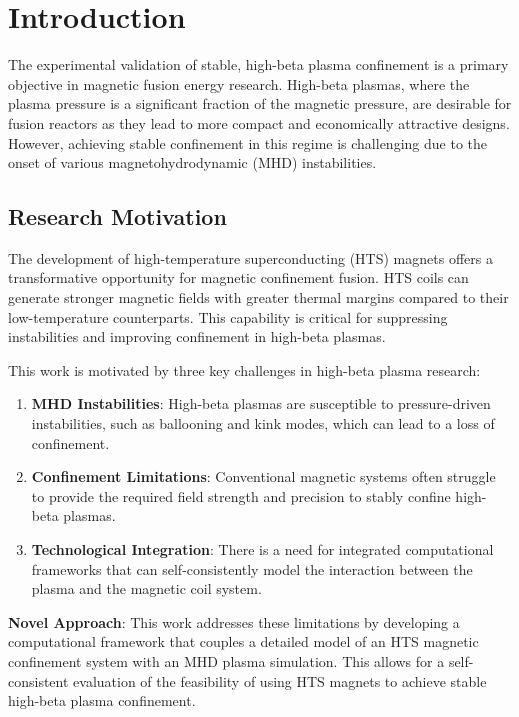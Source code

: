 \documentclass[12pt,a4paper]{article}
\begin{document}
\section{Introduction}

The experimental validation of stable, high-beta plasma confinement is a primary objective in magnetic fusion energy research. High-beta plasmas, where the plasma pressure is a significant fraction of the magnetic pressure, are desirable for fusion reactors as they lead to more compact and economically attractive designs. However, achieving stable confinement in this regime is challenging due to the onset of various magnetohydrodynamic (MHD) instabilities.

\subsection{Research Motivation}

The development of high-temperature superconducting (HTS) magnets offers a transformative opportunity for magnetic confinement fusion. HTS coils can generate stronger magnetic fields with greater thermal margins compared to their low-temperature counterparts. This capability is critical for suppressing instabilities and improving confinement in high-beta plasmas.

This work is motivated by three key challenges in high-beta plasma research:
\begin{enumerate}
\item \textbf{MHD Instabilities}: High-beta plasmas are susceptible to pressure-driven instabilities, such as ballooning and kink modes, which can lead to a loss of confinement.
\item \textbf{Confinement Limitations}: Conventional magnetic systems often struggle to provide the required field strength and precision to stably confine high-beta plasmas.
\item \textbf{Technological Integration}: There is a need for integrated computational frameworks that can self-consistently model the interaction between the plasma and the magnetic coil system.
\end{enumerate}

\textbf{Novel Approach}: This work addresses these limitations by developing a computational framework that couples a detailed model of an HTS magnetic confinement system with an MHD plasma simulation. This allows for a self-consistent evaluation of the feasibility of using HTS magnets to achieve stable high-beta plasma confinement.
\end{document}
